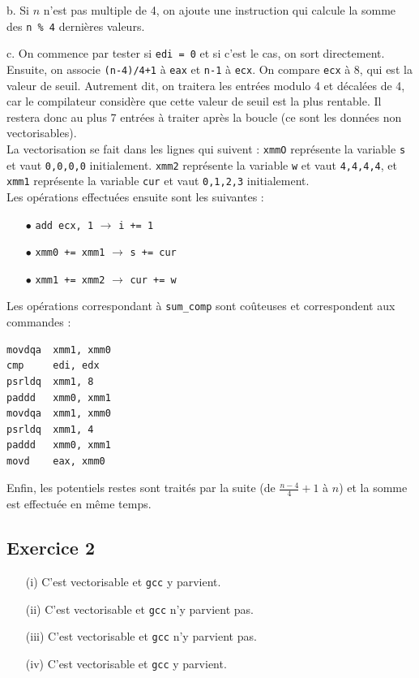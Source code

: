 \documentclass[11pt, a4 paper]{article}
\begin{document}
b. Si $n$ n'est pas multiple de 4, on ajoute une instruction qui calcule la somme des \texttt{n \% 4} dernières valeurs.

c. On commence par tester si \texttt{edi = 0} et si c'est le cas, on sort directement.
Ensuite, on associe \texttt{(n-4)/4+1} à \texttt{eax} et \texttt{n-1} à \texttt{ecx}.
On compare \texttt{ecx} à 8, qui est la valeur de seuil.
Autrement dit, on traitera les entrées modulo 4 et décalées de 4, car le compilateur considère que cette valeur de seuil est la plus rentable.
Il restera donc au plus 7 entrées à traiter après la boucle (ce sont les données non vectorisables).\\
La vectorisation se fait dans les lignes qui suivent : \texttt{xmmO} représente la variable \texttt{s} et vaut \texttt{0,0,0,0} initialement.
\texttt{xmm2} représente la variable \texttt{w} et vaut \texttt{4,4,4,4}, et \texttt{xmm1} représente la variable \texttt{cur} et vaut \texttt{0,1,2,3} initialement.\\
Les opérations effectuées ensuite sont les suivantes :\\
\begin{itemize}
    \item[$\bullet$] \texttt{add ecx, 1} $\longrightarrow$ \texttt{i += 1}\\
    \item[$\bullet$] \texttt{xmm0 += xmm1} $\longrightarrow$ \texttt{s += cur}\\
    \item[$\bullet$] \texttt{xmm1 += xmm2} $\longrightarrow$ \texttt{cur += w}\\
\end{itemize}
Les opérations correspondant à \texttt{sum\_comp} sont coûteuses et correspondent aux commandes :\\
\begin{lstlisting}[style=customasm]
movdqa  xmm1, xmm0
cmp     edi, edx
psrldq  xmm1, 8
paddd   xmm0, xmm1
movdqa  xmm1, xmm0
psrldq  xmm1, 4
paddd   xmm0, xmm1
movd    eax, xmm0
\end{lstlisting}
Enfin, les potentiels restes sont traités par la suite (de $\frac{n-4}{4}+1$ à $n$) et la somme est effectuée en même temps.

\subsection{Exercice 2}
\begin{itemize}
    \item[(i)] C'est vectorisable et \texttt{gcc} y parvient.\\
    \item[(ii)] C'est vectorisable et \texttt{gcc} n'y parvient pas.\\
    \item[(iii)] C'est vectorisable et \texttt{gcc} n'y parvient pas.\\
    \item[(iv)] C'est vectorisable et \texttt{gcc} y parvient.\\
\end{itemize}
\end{document}
